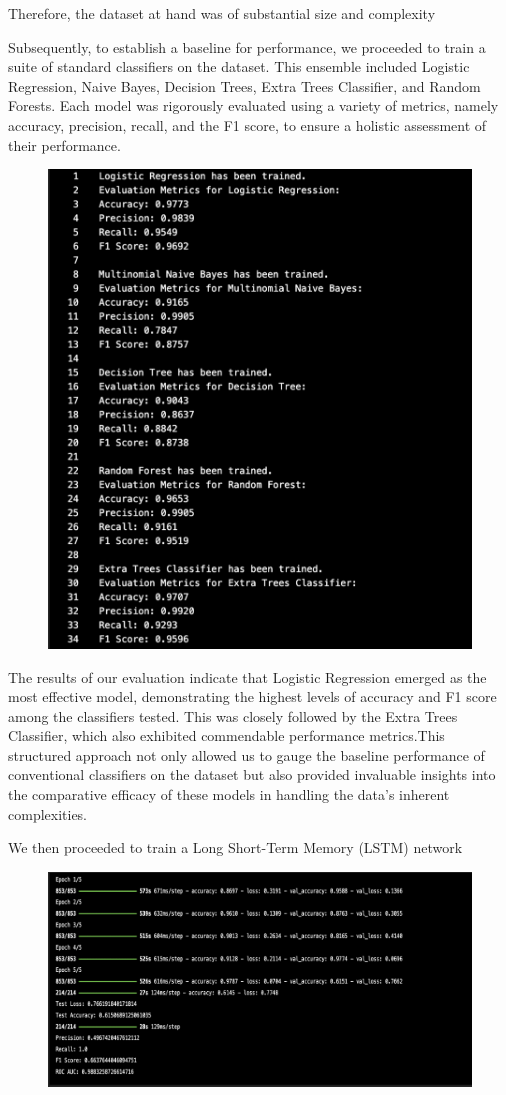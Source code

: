 \documentclass[11pt,a4paper]{article}
\begin{document}
Therefore, the dataset at hand was of substantial size and complexity  

 
Subsequently, to establish a baseline for performance, we proceeded to train a suite of standard classifiers on the dataset. This ensemble included Logistic Regression, Naive Bayes, Decision Trees, Extra Trees Classifier, and Random Forests. Each model was rigorously evaluated using a variety of metrics, namely accuracy, precision, recall, and the F1 score, to ensure a holistic assessment of their performance. 

\begin{figure}[htbp]
  \centering
  \includegraphics[width=0.8\linewidth]{Fig2.png}
\end{figure}
The results of our evaluation indicate that Logistic Regression emerged as the most effective model, demonstrating the highest levels of accuracy and F1 score among the classifiers tested. This was closely followed by the Extra Trees Classifier, which also exhibited commendable performance metrics.This structured approach not only allowed us to gauge the baseline performance of conventional classifiers on the dataset but also provided invaluable insights into the comparative efficacy of these models in handling the data's inherent complexities. 

We then proceeded to train a Long Short-Term Memory (LSTM) network 

\begin{figure}[htbp]
  \centering
  \includegraphics[width=0.8\linewidth]{Fig3.png}
\end{figure}
\end{document}
